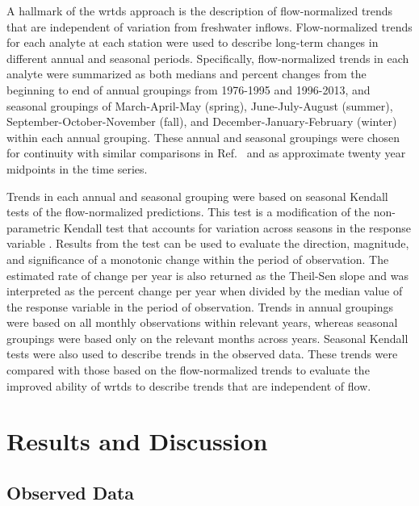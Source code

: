 \documentclass[letterpaper,12pt,oneside]{article}\usepackage[]{graphicx}\usepackage[]{color}
\begin{document}
A hallmark of the \ac{wrtds} approach is the description of flow-normalized trends that are independent of variation from freshwater inflows\cite{Hirsch10}. Flow-normalized trends for each analyte at each station were used to describe long-term changes in different annual and seasonal periods.  Specifically, flow-normalized trends in each analyte were summarized as both medians and percent changes from the beginning to end of annual groupings from 1976-1995 and 1996-2013, and seasonal groupings of March-April-May (spring), June-July-August (summer), September-October-November (fall), and December-January-February (winter) within each annual grouping. These annual and seasonal groupings were chosen for continuity with similar comparisons in Ref.~ and as approximate twenty year midpoints in the time series.  

Trends in each annual and seasonal grouping were based on seasonal Kendall tests of the flow-normalized predictions. This test is a modification of the non-parametric Kendall test that accounts for variation across seasons in the response variable \cite{Hirsch82,Millard13}.  Results from the test can be used to evaluate the direction, magnitude, and significance of a monotonic change within the period of observation.  The estimated rate of change per year is also returned as the Theil-Sen slope and was interpreted as the percent change per year when divided by the median value of the response variable in the period of observation.\cite{Jassby08}  Trends in annual groupings were based on all monthly observations within relevant years, whereas seasonal groupings were based only on the relevant months across years.  Seasonal Kendall tests were also used to describe trends in the observed data.  These trends were compared with those based on the flow-normalized trends to evaluate the improved ability of \ac{wrtds} to describe trends that are independent of flow.

\section{Results and Discussion}

\subsection{Observed Data}

\end{document}

